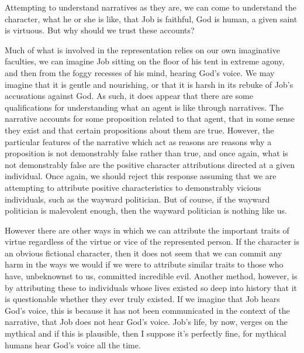 \documentclass[phdthesis,12pt,final]{wuthesis}
\theoremstyle{definition}
\theoremstyle{definition}
\theoremstyle{definition}
\theoremstyle{definition}
\theoremstyle{remark}
\begin{document}
Attempting to understand narratives as they are, we can come to understand the character, what he or she is like, that Job is faithful, God is human, a given saint is virtuous. But why should we trust these accounts?

Much of what is involved in the representation relies on our own imaginative faculties, we can imagine Job sitting on the floor of his tent in extreme agony, and then from the foggy recesses of his mind, hearing God's voice. We may imagine that it is gentle and nourishing, or that it is harsh in its rebuke of Job's accusations against God. As such, it does appear that there are some qualifications for understanding what an agent is like through narratives. The narrative accounts for some proposition related to that agent, that in some sense they exist and that certain propositions about them are true. However, the particular features of the narrative which act as reasons are reasons why a proposition is not demonstrably false rather than true, and once again, what is not demonstrably false are the positive character attributions directed at a given individual. Once again, we should reject this response assuming that we are attempting to attribute positive characteristics to demonstrably vicious individuals, such as the wayward politician. But of course, if the wayward politician is malevolent enough, then the wayward politician is nothing like us.

However there are other ways in which we can attribute the important traits of virtue regardless of the virtue or vice of the represented person. If the character is an obvious fictional character, then it does not seem that we can commit any harm in the ways we would if we were to attribute similar traits to those who have, unbeknownst to us, committed incredible evil. Another method, however, is by attributing these to individuals whose lives existed so deep into history that it is questionable whether they ever truly existed. If we imagine that Job hears God's voice, this is because it has not been communicated in the context of the narrative, that Job does not hear God's voice. Job's life, by now, verges on the mythical and if this is plausible, then I suppose it's perfectly fine, for mythical humans hear God's voice all the time.
\end{document}

